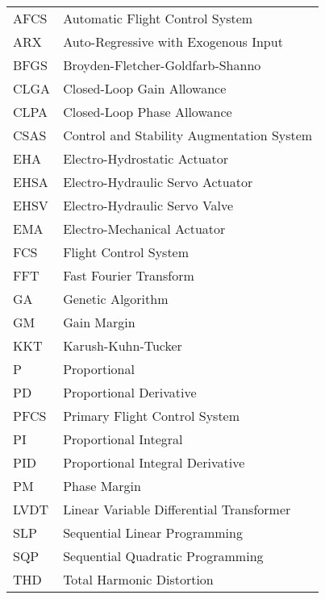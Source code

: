 \begin{longtable}{ll}
	AFCS	& 	Automatic Flight Control System \\
	ARX		&	Auto-Regressive with Exogenous Input \\
	BFGS 	& 	Broyden-Fletcher-Goldfarb-Shanno \\
	CLGA	& 	Closed-Loop Gain Allowance \\
	CLPA	& 	Closed-Loop Phase Allowance \\
	CSAS	& 	Control and Stability Augmentation System \\
	EHA		& 	Electro-Hydrostatic Actuator \\
	EHSA	&	Electro-Hydraulic Servo Actuator \\
	EHSV	&	Electro-Hydraulic Servo Valve \\
	EMA		& 	Electro-Mechanical Actuator \\
	FCS		&	Flight Control System \\
	FFT		& 	Fast Fourier Transform \\
	GA		& 	Genetic Algorithm \\
	GM		& 	Gain Margin \\
	KKT 	& 	Karush-Kuhn-Tucker \\
	P		&	Proportional \\
	PD		&	Proportional Derivative \\
	PFCS	&	Primary Flight Control System \\
	PI		&	Proportional Integral \\
	PID		&	Proportional Integral Derivative \\
	PM		& 	Phase Margin \\
	LVDT	& 	Linear Variable Differential Transformer \\
	SLP 	& 	Sequential Linear Programming \\
	SQP 	& 	Sequential Quadratic Programming \\
	THD 	& 	Total Harmonic Distortion \\
\end{longtable}